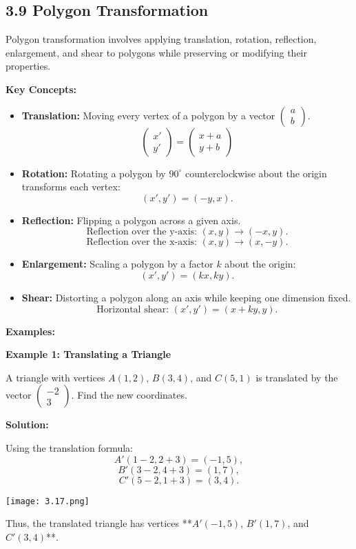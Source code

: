 
\subsection*{3.9 Polygon Transformation}

Polygon transformation involves applying translation, rotation, reflection, enlargement, and shear to polygons while preserving or modifying their properties.

\textbf{Key Concepts:}
\begin{itemize}
	\item \textbf{Translation:} Moving every vertex of a polygon by a vector $\begin{pmatrix} a \\ b \end{pmatrix}$.
	\[
	\begin{pmatrix} x' \\ y' \end{pmatrix} =
	\begin{pmatrix} x + a \\ y + b \end{pmatrix}
	\]
	
	\item \textbf{Rotation:} Rotating a polygon by $90^\circ$ counterclockwise about the origin transforms each vertex:
	\[
	(x', y') = (-y, x).
	\]
	
	\item \textbf{Reflection:} Flipping a polygon across a given axis.
	\[
	\text{Reflection over the y-axis: } (x, y) \to (-x, y).
	\]
	\[
	\text{Reflection over the x-axis: } (x, y) \to (x, -y).
	\]
	
	\item \textbf{Enlargement:} Scaling a polygon by a factor $k$ about the origin:
	\[
	(x', y') = (kx, ky).
	\]
	
	\item \textbf{Shear:} Distorting a polygon along an axis while keeping one dimension fixed.
	\[
	\text{Horizontal shear: } (x', y') = (x + ky, y).
	\]
\end{itemize}

\textbf{Examples:}

\begin{flushleft}
	\textbf{Example 1: Translating a Triangle}
	
	A triangle with vertices $A(1,2)$, $B(3,4)$, and $C(5,1)$ is translated by the vector $\begin{pmatrix} -2 \\ 3 \end{pmatrix}$. Find the new coordinates.
	
	\textbf{Solution:}
	
	Using the translation formula:
	\[
	A'(1-2, 2+3) = (-1,5),
	\]
	\[
	B'(3-2, 4+3) = (1,7),
	\]
	\[
	C'(5-2, 1+3) = (3,4).
	\]
	
	\begin{center}
		\texttt{[image: 3.17.png]}
	\end{center}
	Thus, the translated triangle has vertices **$A'(-1,5)$, $B'(1,7)$, and $C'(3,4)$**.
\end{flushleft}

